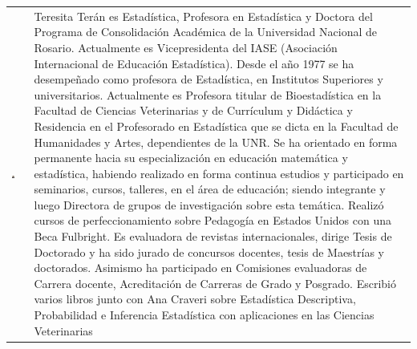 \begin{table}[H]
\centering
\begin{tabular}{m{}  m{}}
\begin{center} 
\includegraphics[width=0.2\textwidth]{./fotos/teran} \end{center} & 
\noindent \small{Teresita Terán es Estadística, Profesora en Estadística y Doctora del Programa de Consolidación Académica de la Universidad Nacional de Rosario.
Actualmente es Vicepresidenta del IASE (Asociación Internacional de Educación Estadística). Desde el año 1977 se ha desempeñado como profesora de Estadística, en Institutos Superiores y universitarios. Actualmente es Profesora titular de Bioestadística en la Facultad de Ciencias Veterinarias y de Currículum y Didáctica
y Residencia en el Profesorado en Estadística que se dicta en la Facultad de Humanidades y Artes, dependientes de la UNR. Se ha orientado en forma permanente hacia su especialización en educación matemática y estadística, habiendo realizado en forma continua estudios y participado en seminarios, cursos, talleres, en el área de educación; siendo integrante y luego Directora de grupos de investigación sobre esta temática. Realizó cursos de  perfeccionamiento sobre Pedagogía en Estados Unidos con una Beca Fulbright. Es evaluadora de revistas internacionales, dirige Tesis de Doctorado y ha sido jurado de concursos docentes, tesis de Maestrías y doctorados. Asimismo ha participado en Comisiones evaluadoras de Carrera docente, Acreditación de Carreras de Grado y Posgrado. Escribió varios libros junto con Ana Craveri sobre Estadística Descriptiva, Probabilidad e Inferencia Estadística con aplicaciones en las Ciencias Veterinarias} \\
\end{tabular}
\end{table}



 